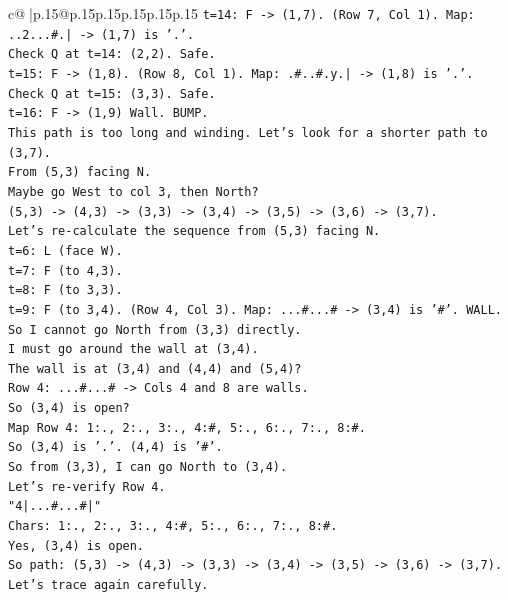 \documentclass{article}
\begin{document}
{\begin{supertabular}{c@{$\;$}|p{.15\linewidth}@{}p{.15\linewidth}p{.15\linewidth}p{.15\linewidth}p{.15\linewidth}p{.15\linewidth}}
{{{\texttt{t=14: F {-}> (1,7). (Row 7, Col 1). Map: ..2...\#.| {-}> (1,7) is '.'.} \\
\texttt{Check Q at t=14: (2,2). Safe.} \\
\texttt{t=15: F {-}> (1,8). (Row 8, Col 1). Map: .\#..\#.y.| {-}> (1,8) is '.'.} \\
\texttt{Check Q at t=15: (3,3). Safe.} \\
\texttt{t=16: F {-}> (1,9) Wall. BUMP.} \\
\texttt{This path is too long and winding. Let's look for a shorter path to (3,7).} \\
\texttt{From (5,3) facing N.} \\
\texttt{Maybe go West to col 3, then North?} \\
\texttt{(5,3) {-}> (4,3) {-}> (3,3) {-}> (3,4) {-}> (3,5) {-}> (3,6) {-}> (3,7).} \\
\texttt{Let's re{-}calculate the sequence from (5,3) facing N.} \\
\texttt{t=6: L (face W).} \\
\texttt{t=7: F (to 4,3).} \\
\texttt{t=8: F (to 3,3).} \\
\texttt{t=9: F (to 3,4). (Row 4, Col 3). Map: ...\#...\# {-}> (3,4) is '\#'. WALL.} \\
\texttt{So I cannot go North from (3,3) directly.} \\
\texttt{I must go around the wall at (3,4).} \\
\texttt{The wall is at (3,4) and (4,4) and (5,4)?} \\
\texttt{Row 4: ...\#...\# {-}> Cols 4 and 8 are walls.} \\
\texttt{So (3,4) is open?} \\
\texttt{Map Row 4: 1:., 2:., 3:., 4:\#, 5:., 6:., 7:., 8:\#.} \\
\texttt{So (3,4) is '.'. (4,4) is '\#'.} \\
\texttt{So from (3,3), I can go North to (3,4).} \\
\texttt{Let's re{-}verify Row 4.} \\
\texttt{"4|...\#...\#|"} \\
\texttt{Chars: 1:., 2:., 3:., 4:\#, 5:., 6:., 7:., 8:\#.} \\
\texttt{Yes, (3,4) is open.} \\
\texttt{So path: (5,3) {-}> (4,3) {-}> (3,3) {-}> (3,4) {-}> (3,5) {-}> (3,6) {-}> (3,7).} \\
\texttt{Let's trace again carefully.} \\
}}}
\end{supertabular}}
\end{document}

